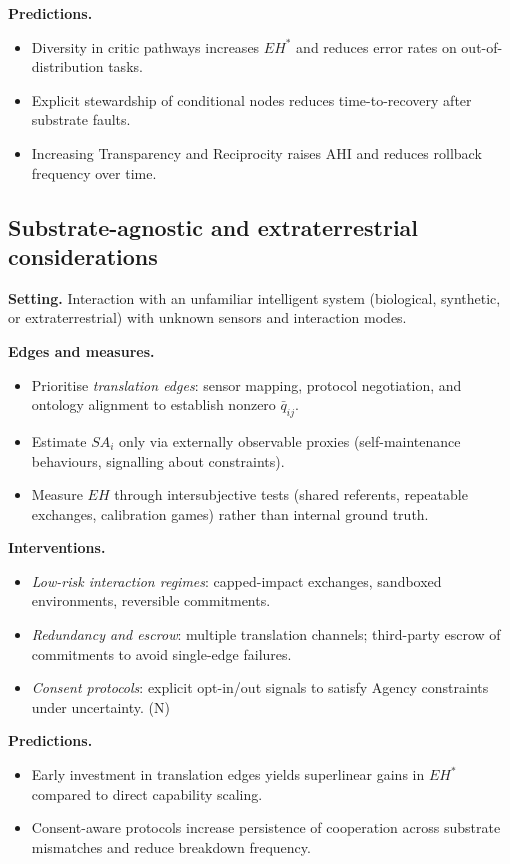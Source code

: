 \documentclass[12pt]{article}
\begin{document}
\noindent\textbf{Predictions.}
\begin{itemize}[leftmargin=1.2em]
\item Diversity in critic pathways increases $EH^\ast$ and reduces error rates on out-of-distribution tasks.
\item Explicit stewardship of conditional nodes reduces time-to-recovery after substrate faults.
\item Increasing Transparency and Reciprocity raises AHI and reduces rollback frequency over time.
\end{itemize}

\subsection{Substrate-agnostic and extraterrestrial considerations}
\textbf{Setting.} Interaction with an unfamiliar intelligent system (biological, synthetic, or extraterrestrial) with unknown sensors and interaction modes.
\medskip

\noindent\textbf{Edges and measures.}
\begin{itemize}[leftmargin=1.2em]
\item Prioritise \emph{translation edges}: sensor mapping, protocol negotiation, and ontology alignment to establish nonzero $\bar{q}_{ij}$.
\item Estimate $SA_i$ only via externally observable proxies (self-maintenance behaviours, signalling about constraints).
\item Measure $EH$ through intersubjective tests (shared referents, repeatable exchanges, calibration games) rather than internal ground truth.
\end{itemize}

\noindent\textbf{Interventions.}
\begin{itemize}[leftmargin=1.2em]
\item \emph{Low-risk interaction regimes}: capped-impact exchanges, sandboxed environments, reversible commitments.
\item \emph{Redundancy and escrow}: multiple translation channels; third-party escrow of commitments to avoid single-edge failures.
\item \emph{Consent protocols}: explicit opt-in/out signals to satisfy Agency constraints under uncertainty. (N)
\end{itemize}

\noindent\textbf{Predictions.}
\begin{itemize}[leftmargin=1.2em]
\item Early investment in translation edges yields superlinear gains in $EH^\ast$ compared to direct capability scaling.
\item Consent-aware protocols increase persistence of cooperation across substrate mismatches and reduce breakdown frequency.
\end{itemize}
\end{document}
